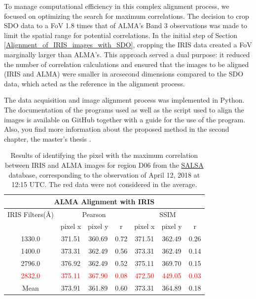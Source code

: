 \documentclass[a4paper,alpha-refs]{eSpectra}
\begin{document}
To manage computational efficiency in this complex alignment process, we focused on optimizing the search for maximum correlations. The decision to crop SDO data to a FoV 1.8 times that of ALMA's Band 3 observations was made to limit the spatial range for potential correlations. In the initial step of Section \ref{Alignment_of_IRIS_images_with_SDO}, cropping the IRIS data created a FoV marginally larger than ALMA's. This approach served a dual purpose: it reduced the number of correlation calculations and ensured that the images to be aligned (IRIS and ALMA) were smaller in arcsecond dimensions compared to the SDO data, which acted as the reference in the alignment process.


The data acquisition and image alignment process was implemented in Python. The documentation of the programs used as well as the script used to align the images is available on GitHub \cite{gibhub_reporsitory_alignment} together with a guide for the use of the program. Also, you find more information about the proposed method in the second chapter, the master's thesis \cite{araujo_dynamics_2024}.




\begin{table}[!htp]
\centering
\begin{tabular}{ccccccc}
\toprule
\toprule
\multicolumn{7}{c}{ALMA Alignment with IRIS} \\ 
\midrule
\multicolumn{1}{c}{IRIS Filters(Å)} & \multicolumn{3}{c}{Pearson} & \multicolumn{3}{c}{SSIM} \\ 
\cmidrule(lr){2-4} \cmidrule(lr){5-7}
& pixel x & pixel y & r & pixel x & pixel y & r \\
\midrule
1330.0 & 371.51 & 360.69 & 0.72 & 371.51 & 362.49 & 0.26 \\
1400.0 & 373.31 & 362.49 & 0.56 & 373.31 & 362.49 & 0.14 \\
2796.0 & 376.92 & 362.49 & 0.52 & 375.11 & 369.70 & 0.15 \\

\textcolor{red}{2832.0} & \textcolor{red}{375.11} & \textcolor{red}{367.90} & \textcolor{red}{0.08} & \textcolor{red}{472.50} & \textcolor{red}{449.05} & \textcolor{red}{0.03}\\
Mean   & 373.91 & 361.89 & 0.60 & 373.31 & 364.89 & 0.18 \\
\bottomrule
\end{tabular}
\caption{Results of identifying the pixel with the maximum correlation between IRIS and ALMA images for region D06 from the \href{http://sdc.uio.no/salsa/}{SALSA} database, corresponding to the observation of April 12, 2018 at 12:15 UTC. The red data were not considered in the average.}
\label{chap_2:result_IRIS_and_ALMA_align}
\end{table}
\end{document}
